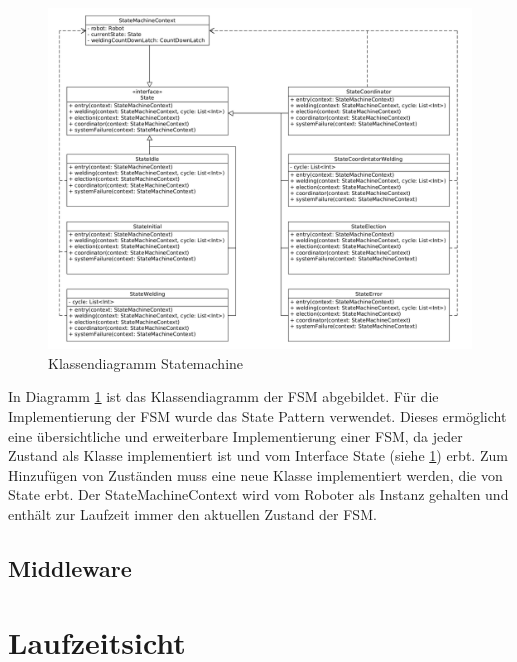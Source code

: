 \begin{figure}[h]
 \includegraphics[width=\textwidth]{../diagrams/5_fsm_klassendiagramm.png}
 \caption{Klassendiagramm Statemachine}
 \label{fig:class_fsm}
\end{figure}

In Diagramm \ref{fig:class_fsm} ist das Klassendiagramm der FSM abgebildet. Für die Implementierung der FSM
wurde das State Pattern \citep{patterns} verwendet. Dieses ermöglicht eine übersichtliche und erweiterbare
Implementierung einer FSM, da jeder Zustand als Klasse implementiert ist und vom Interface \glqq State\grqq{}
(siehe \ref{fig:class_fsm}) erbt. Zum Hinzufügen von Zuständen muss eine neue Klasse implementiert werden, die 
von State erbt. Der StateMachineContext wird vom Roboter als Instanz gehalten und enthält zur Laufzeit immer
den aktuellen Zustand der FSM.

\subsection{Middleware}



\section{Laufzeitsicht}
